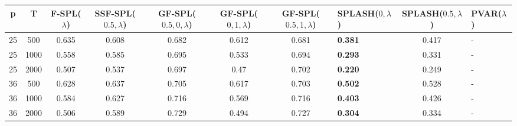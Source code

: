 \begin{tabular}{ccccccclcl}
\hline
  p  &  T   &  F-SPL($\lambda$)  &  SSF-SPL($0.5, \lambda$)  &  GF-SPL($0.5, 0, \lambda$)  &  GF-SPL($0, 1, \lambda$)  &  GF-SPL($0.5, 1, \lambda$)  & SPLASH($0, \lambda$)   &  SPLASH($0.5, \lambda$)  & PVAR($\lambda$)   \\
\hline
 25  & 500  &       0.635        &           0.608           &            0.682            &           0.612           &            0.681            & \textbf{0.381}         &          0.417           & -                 \\
 25  & 1000 &       0.558        &           0.585           &            0.695            &           0.533           &            0.694            & \textbf{0.293}         &          0.331           & -                 \\
 25  & 2000 &       0.507        &           0.537           &            0.697            &           0.47            &            0.702            & \textbf{0.220}         &          0.249           & -                 \\
 36  & 500  &       0.628        &           0.637           &            0.705            &           0.617           &            0.703            & \textbf{0.502}         &          0.528           & -                 \\
 36  & 1000 &       0.584        &           0.627           &            0.716            &           0.569           &            0.716            & \textbf{0.403}         &          0.426           & -                 \\
 36  & 2000 &       0.506        &           0.589           &            0.729            &           0.494           &            0.727            & \textbf{0.304}         &          0.334           & -                 \\
\hline
\end{tabular}